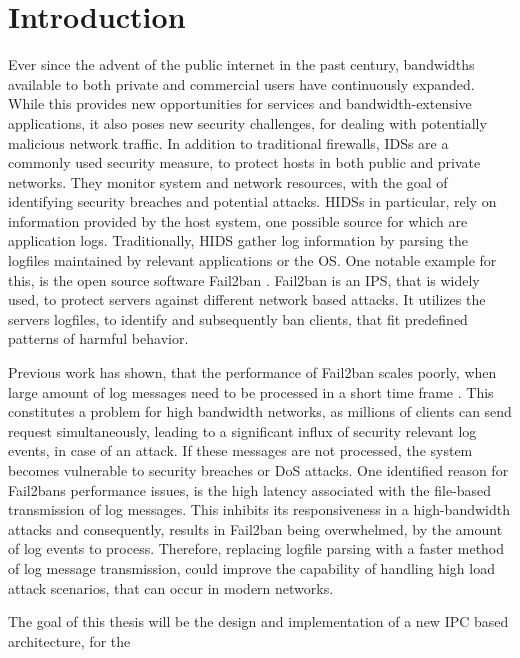 %
%

\chapter{Introduction}
\label{sec:intro}

Ever since the advent of the public internet in the past century, bandwidths available to both
private and commercial users have continuously expanded. While this provides new opportunities for services and bandwidth-extensive 
applications, it also poses new security challenges, for dealing with potentially malicious network traffic. In addition to traditional firewalls, 
\acp{IDS} are a commonly used security measure, to protect hosts in both public and private networks. They
monitor system and network resources, with the goal of identifying security breaches and potential attacks. \acp{HIDS} in particular, rely
on information provided by the host system, one possible source for which are application logs. Traditionally, \ac{HIDS} gather log information by 
parsing the logfiles maintained by relevant applications or the \ac{OS}. One notable example for this, is the open source software Fail2ban \cite{fail2ban}. Fail2ban is
an \ac{IPS}, that is widely used, to protect servers against different network based attacks. It
utilizes the servers logfiles, to identify and subsequently ban clients, that fit predefined patterns of harmful behavior. 
\par
Previous work has shown, that the performance of Fail2ban scales poorly, when large amount of log messages need to be processed in a short time frame \cite{mikolajczak2022}. This constitutes
a problem for high bandwidth networks, as millions of clients can send request simultaneously, leading to a significant influx of security relevant log events, in case of an attack.  
If these messages are not processed, the system becomes vulnerable to security breaches or \ac{DoS} attacks. One identified reason for Fail2bans performance issues, is the high latency associated with
the file-based transmission of log messages. This inhibits its responsiveness in a high-bandwidth attacks and consequently, results in Fail2ban being overwhelmed, by the amount of log events to process. 
Therefore, replacing logfile parsing with a faster method of log message transmission, could improve the capability of handling high load attack scenarios, that can occur in modern networks. 
\par
The goal of this thesis will be the design and implementation of a new \ac{IPC} based architecture, for the
